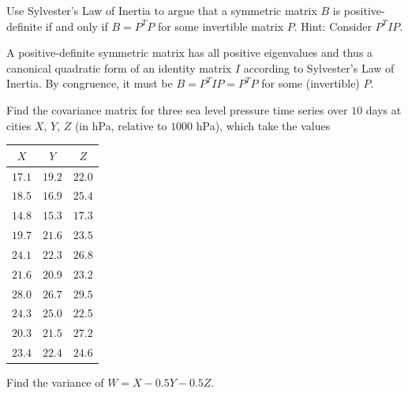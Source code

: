 \begin{Exercise}
\label{ex:sylvesterdefinite}
Use Sylvester's Law of Inertia to argue that a symmetric matrix $B$ is positive-definite if and only if $B = P^TP$ for some invertible matrix $P$. Hint: Consider $P^T IP$.
\end{Exercise}
\begin{Answer}
A positive-definite symmetric matrix has all positive eigenvalues and thus a canonical quadratic form of an identity matrix $I$ according to Sylvester's Law of Inertia. By congruence, it must be $B = P^T IP = P^TP$ for some (invertible) $P$.
\end{Answer}

\begin{Exercise}
Find the covariance matrix for three sea level pressure time series over $10$ days at cities $X$, $Y$, $Z$ (in hPa, relative to $1000$ hPa), which take the values
\begin{center}
\begin{tabular}{|c|c|c|}
\hline
$X$ & $Y$ & $Z$ \\
\hline
$17.1$ & $19.2$ & $22.0$ \\
\hline
$18.5$ & $16.9$ & $25.4$ \\
\hline
$14.8$ & $15.3$ & $17.3$ \\
\hline
$19.7$ & $21.6$ & $23.5$ \\
\hline
$24.1$ & $22.3$ & $26.8$ \\
\hline
$21.6$ & $20.9$ & $23.2$ \\
\hline 
$28.0$ & $26.7$ & $29.5$ \\
\hline
$24.3$ & $25.0$ & $22.$5 \\
\hline
$20.3$ & $21.5$ & $27.2$ \\
\hline
$23.4$ & $22.4$ & $24.6$ \\
\hline
\end{tabular}
\end{center}
Find the variance of $W = X - 0.5Y - 0.5Z$.
\end{Exercise}
